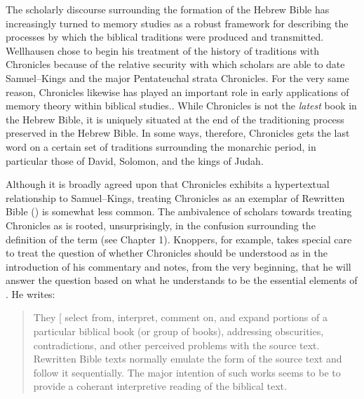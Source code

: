  The scholarly discourse surrounding the formation of the Hebrew Bible has increasingly turned to memory studies as a robust framework for describing the processes by which the biblical traditions were produced and transmitted.\autocites{wright2014}{blenkinsopp2013}{rogerson2010}{davies2008}{hendel2005}{smith_cbq2002} Wellhausen chose to begin his treatment of the history of traditions with Chronicles because of the relative security with which scholars are able to date Samuel--Kings and the major Pentateuchal strata \visavis Chronicles. For the very same reason, Chronicles likewise has played an important role in early applications of memory theory within biblical studies.\autocites{benzvi_st2017}{benzvi-a_evans-williams2013}{benzvi-b_evans-williams2013}. While Chronicles is not the \emph{latest} book in the Hebrew Bible, it is uniquely situated at the end of the traditioning process preserved in the Hebrew Bible. In some ways, therefore, Chronicles gets the last word on a certain set of traditions surrounding the monarchic period, in particular those of David, Solomon, and the kings of Judah. 

 Although it is broadly agreed upon that Chronicles exhibits a hypertextual relationship to Samuel--Kings, treating Chronicles as an exemplar of Rewritten Bible (\rwb) is somewhat less common.\autocites[Though, not particularly \emph{un}common:][]{campbell_zsengeller2014}{zahn_lim-collins2010}{bernstein_textus2005}[Alexander considers Chronicles to be a ``prototype'' of \rwb, see][100]{alexander_carson-williamson1988}[I have adopted the terminology of hyper-/hypotext from Genette. In this case, to say that Chronicles is a ``hypertext'' of Samuel--Kings is to say that it is derivative, but not a commentary on Samuel--Kings. See][5]{genette1997} The ambivalence of scholars towards treating Chronicles as \rwb is rooted, unsurprisingly, in the confusion surrounding the definition of the term (see Chapter 1). Knoppers, for example, takes special care to treat the question of whether Chronicles should be understood as \rwb in the introduction of his commentary and notes, from the very beginning, that he will answer the question based on what he understands to be the essential elements of \rwb.\autocite[ , 129--134]{knoppers2003} He writes: 

 \begin{quote} They {[}\rwb{]} select from, interpret, comment on, and expand portions of a particular biblical book (or group of books), addressing obscurities, contradictions, and other perceived problems with the source text. Rewritten Bible texts normally emulate the form of the source text and follow it sequentially. The major intention of such works seems to be to provide a coherant interpretive reading of the biblical text.\autocite[130]{knoppers2003} \end{quote} 

